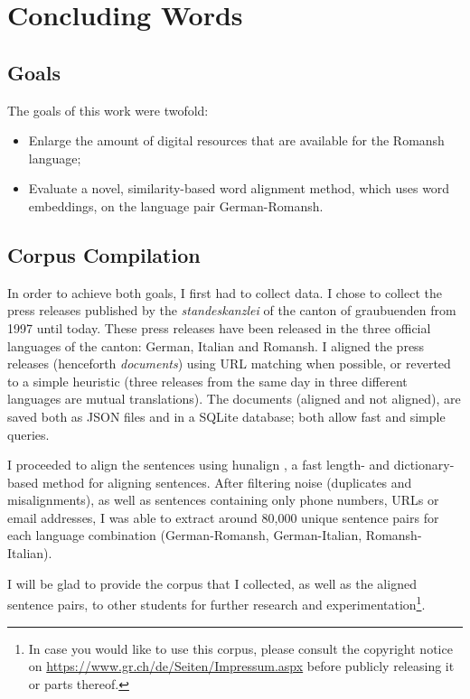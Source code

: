 \chapter{Concluding Words}\label{chap:summary}

\section{Goals}
The goals of this work were twofold: 
\begin{itemize}
	\item Enlarge the amount of digital resources that are available for the Romansh language;
	\item Evaluate a novel, similarity-based word alignment method, which uses word embeddings, on the language pair German-Romansh.
\end{itemize}


\section{Corpus Compilation}
In order to achieve both goals, I first had to collect data. 
I chose to collect the press releases published by the \emph{\Gls{standeskanzlei}} of the canton of \Gls{graubuenden} from 1997 until today. 
These press releases have been released in the three official languages of the canton: German, Italian and Romansh. 
I aligned the press releases (henceforth \emph{documents}) using URL matching when possible, or reverted to a simple heuristic (three releases from the same day in three different languages are mutual translations).
The documents (aligned and not aligned), are saved both as \acrshort{JSON} files and in a SQLite database; both allow  fast and simple queries.

I  proceeded to align the sentences using hunalign \autocite{hunalign}, a fast length- and dictionary-based method for aligning sentences. 
After filtering noise (duplicates and misalignments), as well as sentences containing only phone numbers, \acrshort{URL}s or email addresses, I was able to extract around 80,000 unique sentence pairs for each language combination (German-Romansh, German-Italian, Romansh-Italian).

I will be glad to provide  the corpus that I collected, as well as the aligned sentence pairs, to other students for further research and experimentation{\footnote{In case you would like to use this corpus, please consult the copyright notice on \url{https://www.gr.ch/de/Seiten/Impressum.aspx} before publicly releasing it or parts thereof.}}. 

